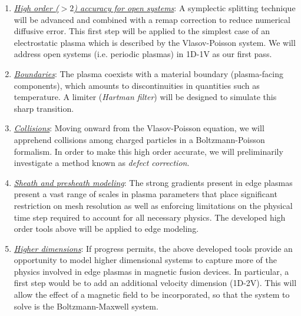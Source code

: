 \documentclass[11pt,titlepage]{report}
\begin{document}
\begin{enumerate}
\item \underline{\emph{High order ($> 2$) accuracy for open systems}}: A symplectic splitting technique will be advanced and combined with a remap correction to reduce numerical diffusive error. This first step will be applied to the simplest case of an electrostatic plasma which is described by the Vlasov-Poisson system. We will address open systems (i.e. periodic plasmas) in 1D-1V as our first pass.

\item \underline{\emph{Boundaries}}: The plasma coexists with a material boundary (plasma-facing components), which amounts to discontinuities in quantities such as temperature. A limiter (\emph{Hartman filter}) will be designed to simulate this sharp transition.

\item \underline{\emph{Collisions}}: Moving onward from the Vlasov-Poisson equation, we will apprehend collisions among charged particles in a Boltzmann-Poisson formalism. In order to make this high order accurate, we will preliminarily investigate a method known as \emph{defect correction}.

\item \underline{\emph{Sheath and presheath modeling}}: The strong gradients present in edge plasmas present a vast range of scales in plasma parameters that place significant restriction on mesh resolution as well as enforcing limitations on the physical time step required to account for all necessary physics. The developed high order tools above will be applied to edge modeling.

\item \underline{\emph{Higher dimensions}}: If progress permits, the above developed tools provide an opportunity to model higher dimensional systems to capture more of the physics involved in edge plasmas in magnetic fusion devices. In particular, a first step would be to add an additional velocity dimension (1D-2V). This will allow the effect of a magnetic field to be incorporated, so that the system to solve is the Boltzmann-Maxwell system.

\end{enumerate}
\end{document}
